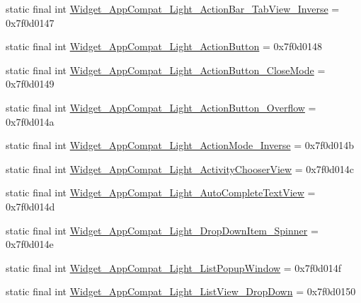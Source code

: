 \begin{DoxyCompactItemize}
static final int \mbox{\hyperlink{classandroid_1_1support_1_1v7_1_1appcompat_1_1_r_1_1style_a21a9aa7a229e40e4a8c82c548231428b}{Widget\+\_\+\+App\+Compat\+\_\+\+Light\+\_\+\+Action\+Bar\+\_\+\+Tab\+View\+\_\+\+Inverse}} = 0x7f0d0147
\item 
static final int \mbox{\hyperlink{classandroid_1_1support_1_1v7_1_1appcompat_1_1_r_1_1style_acaf931b355085f1113e3b6eb704675ae}{Widget\+\_\+\+App\+Compat\+\_\+\+Light\+\_\+\+Action\+Button}} = 0x7f0d0148
\item 
static final int \mbox{\hyperlink{classandroid_1_1support_1_1v7_1_1appcompat_1_1_r_1_1style_ad3c7c2d85cd3f22d358820d04d569c21}{Widget\+\_\+\+App\+Compat\+\_\+\+Light\+\_\+\+Action\+Button\+\_\+\+Close\+Mode}} = 0x7f0d0149
\item 
static final int \mbox{\hyperlink{classandroid_1_1support_1_1v7_1_1appcompat_1_1_r_1_1style_add5dbe0e01ecdf1261ee66a28706a73f}{Widget\+\_\+\+App\+Compat\+\_\+\+Light\+\_\+\+Action\+Button\+\_\+\+Overflow}} = 0x7f0d014a
\item 
static final int \mbox{\hyperlink{classandroid_1_1support_1_1v7_1_1appcompat_1_1_r_1_1style_ae4bb55ea86baa80af869e20ee5e13385}{Widget\+\_\+\+App\+Compat\+\_\+\+Light\+\_\+\+Action\+Mode\+\_\+\+Inverse}} = 0x7f0d014b
\item 
static final int \mbox{\hyperlink{classandroid_1_1support_1_1v7_1_1appcompat_1_1_r_1_1style_a30088bd610ce6ddc26c4b238f5fe5593}{Widget\+\_\+\+App\+Compat\+\_\+\+Light\+\_\+\+Activity\+Chooser\+View}} = 0x7f0d014c
\item 
static final int \mbox{\hyperlink{classandroid_1_1support_1_1v7_1_1appcompat_1_1_r_1_1style_acf51db74e8bac502d7f6b925d770ddb4}{Widget\+\_\+\+App\+Compat\+\_\+\+Light\+\_\+\+Auto\+Complete\+Text\+View}} = 0x7f0d014d
\item 
static final int \mbox{\hyperlink{classandroid_1_1support_1_1v7_1_1appcompat_1_1_r_1_1style_afde000240c9b9a8bdd20c4e2717b4e63}{Widget\+\_\+\+App\+Compat\+\_\+\+Light\+\_\+\+Drop\+Down\+Item\+\_\+\+Spinner}} = 0x7f0d014e
\item 
static final int \mbox{\hyperlink{classandroid_1_1support_1_1v7_1_1appcompat_1_1_r_1_1style_abfa51aa4e5ff8b59414f140fdcb09c3f}{Widget\+\_\+\+App\+Compat\+\_\+\+Light\+\_\+\+List\+Popup\+Window}} = 0x7f0d014f
\item 
static final int \mbox{\hyperlink{classandroid_1_1support_1_1v7_1_1appcompat_1_1_r_1_1style_a9bab891cd272faea9b47904984f006d3}{Widget\+\_\+\+App\+Compat\+\_\+\+Light\+\_\+\+List\+View\+\_\+\+Drop\+Down}} = 0x7f0d0150
\item 

\end{DoxyCompactItemize}
